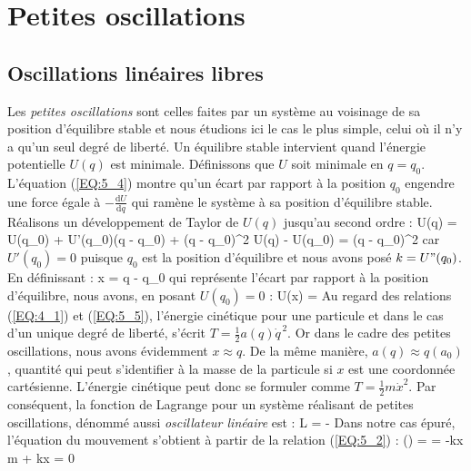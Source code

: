 \chapter{Petites oscillations}

\section{Oscillations lin\'eaires libres}\label{PAR:21}

Les \emph{petites oscillations} sont celles faites par un syst\`eme au voisinage de sa position d'\'equilibre stable et nous étudions ici le cas le plus simple, celui où il n'y a qu'un seul degr\'e de libert\'e. Un \'equilibre stable intervient quand l'\'energie potentielle $U(q)$ est minimale. D\'efinissons que $U$ soit minimale en $q = q_{0}$. L'\'equation (\ref{EQ:5_4}) montre qu'un \'ecart par rapport \`a la position $q_{0}$ engendre une force \'egale \`a $-\frac{\mathrm{d}U}{\mathrm{d}q}$ qui ram\`ene le syst\`eme \`a sa position d'\'equilibre stable. R\'ealisons un d\'eveloppement de Taylor de $U(q)$ jusqu'au second ordre :
\benn
	U(q) = U(q_{0}) + U'(q_{0})(q - q_{0}) + (q - q_{0})^{2} \Leftrightarrow U(q) - U(q_{0}) = (q - q_{0})^{2}
\eenn
car $U'(q_{0}) = 0$ puisque $q_{0}$ est la position d'\'equilibre et nous avons pos\'e $k = U"(q_{0})$. En d\'efinissant :
\be
	x = q - q_{0} \label{EQ:21_1}
\ee
qui repr\'esente l'\'ecart par rapport \`a la position d'\'equilibre, nous avons, en posant $U(q_{0}) = 0$ :
\be
	U(x) =  \label{EQ:21_2}
\ee
Au regard des relations (\ref{EQ:4_1}) et (\ref{EQ:5_5}), l'\'energie cin\'etique pour une particule et dans le cas d'un unique degr\'e de libert\'e, s'\'ecrit $T = \frac{1}{2}a(q)\dot{q}^{\,2}$. Or dans le cadre des petites oscillations, nous avons \'{e}videmment $x \approx q$. De la m\^eme mani\`ere, $a(q) \approx q(a_{0})$, quantit\'e qui peut s'identifier \`a la masse de la particule si $x$ est une coordonn\'ee cart\'esienne. L'\'energie cin\'etique peut donc se formuler comme $T = \frac{1}{2}m\dot{x}^{2}$. Par cons\'equent, la fonction de Lagrange pour un syst\`eme r\'ealisant de petites oscillations, d\'enomm\'e aussi \emph{oscillateur lin\'eaire} est :
\be
	L =  -  \label{EQ:21_3}
\ee
Dans notre cas \'epur\'e, l'\'equation du mouvement s'obtient \`a partir de la relation (\ref{EQ:5_2}) :
\be
	\left(\right) =  \Leftrightarrow {} = -kx \Leftrightarrow m + kx = 0 \label{EQ:21_4}
